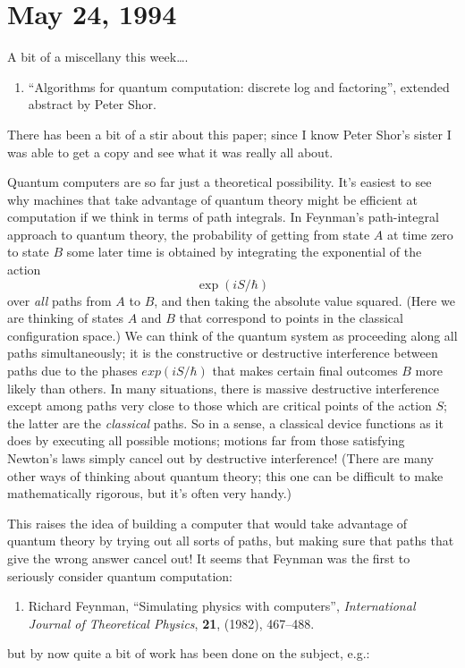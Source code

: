 \documentclass[12pt]{article}
\def\tightlist{}
\begin{document}
\hypertarget{week34}{%
\section{May 24, 1994}\label{week34}}

A bit of a miscellany this week\ldots.

\begin{enumerate}
\def\labelenumi{\arabic{enumi})}
\tightlist
\item
  ``Algorithms for quantum computation: discrete log and factoring'',
  extended abstract by Peter Shor.
\end{enumerate}
\noindent
There has been a bit of a stir about this paper; since I know Peter
Shor's sister I was able to get a copy and see what it was really all
about.

Quantum computers are so far just a theoretical possibility. It's
easiest to see why machines that take advantage of quantum theory might
be efficient at computation if we think in terms of path integrals. In
Feynman's path-integral approach to quantum theory, the probability of
getting from state \(A\) at time zero to state \(B\) some later time is
obtained by integrating the exponential of the action 
\[\exp(iS/\hbar)\]
over \emph{all} paths from \(A\) to \(B\), and then taking the absolute
value squared. (Here we are thinking of states \(A\) and \(B\) that
correspond to points in the classical configuration space.) We can think
of the quantum system as proceeding along all paths simultaneously; it
is the constructive or destructive interference between paths due to the
phases \(exp(iS/\hbar)\) that makes certain final outcomes \(B\) more
likely than others. In many situations, there is massive destructive
interference except among paths very close to those which are critical
points of the action \(S\); the latter are the \emph{classical} paths.
So in a sense, a classical device functions as it does by executing all
possible motions; motions far from those satisfying Newton's laws simply
cancel out by destructive interference! (There are many other ways of
thinking about quantum theory; this one can be difficult to make
mathematically rigorous, but it's often very handy.)

This raises the idea of building a computer that would take advantage of
quantum theory by trying out all sorts of paths, but making sure that
paths that give the wrong answer cancel out! It seems that Feynman was
the first to seriously consider quantum computation:

\begin{enumerate}
\def\labelenumi{\arabic{enumi})}
\setcounter{enumi}{1}
\tightlist
\item
   Richard Feynman, ``Simulating physics with computers'',
  \emph{International Journal of Theoretical Physics},  \textbf{21},
  (1982), 467--488.
\end{enumerate}
\noindent
but by now quite a bit of work has been done on the subject, e.g.:
\end{document}
